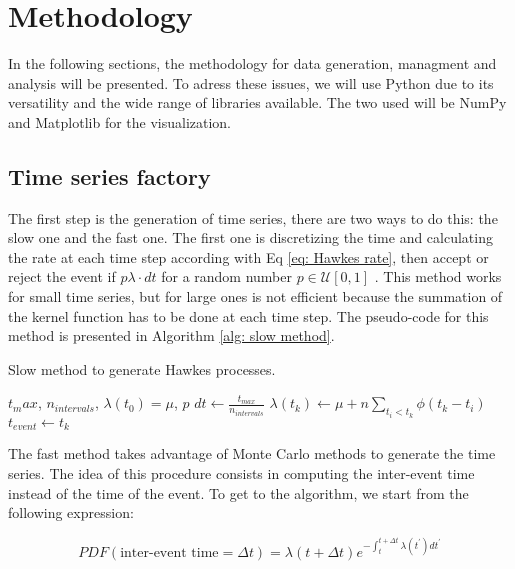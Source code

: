 \chapter{Methodology}\label{ch:metodologia}

In the following sections, the methodology for data generation, managment and analysis will be presented. To adress these issues, we will use Python \cite{McKinney,VanderPlas} due to 
its versatility and the wide range of libraries available. The two used will be NumPy \cite{numpy} and Matplotlib \cite{matplotlib} for the visualization.
 
\section{Time series factory}\label{sec:time_series_factory}

The first step is the generation of time series, there are two ways to do this: the slow one and the fast one. The first one is discretizing the time and calculating the rate at each time step
according with Eq \ref{eq: Hawkes rate}, then accept or reject the event if $p\lambda \cdot dt$ for a random number $p\in \mathcal{U}[0,1]$ . 
This method works for small time series, but for large ones is not efficient because the summation of the kernel function has to be done at each time step. The pseudo-code for this method is
presented in Algorithm \ref{alg: slow method}.

\begin{algorithm}
    \caption{Slow method to generate Hawkes processes.}\label{alg: slow method}
    \begin{algorithmic}
        \Require $t_max$, $n_{intervals}$, $\lambda(t_0)=\mu$, $p$
        \State $dt \gets \frac{t_{max}}{n_{intervals}}$
            \State $\lambda(t_k) \gets \mu + n\sum_{t_i<t_k}\phi(t_k-t_i)$ 
                \State $t_{event} \gets t_k$
            \EndIf
        \EndFor
        \end{algorithmic}
\end{algorithm}

The fast method takes advantage of Monte Carlo methods \cite{barbu2020monte} to generate the time series. The idea of this procedure consists in computing the inter-event time instead 
of the time of the event. To get to the algorithm, we start from the following expression:

\begin{equation}
    PDF(\text{inter-event time}=\Delta t) = \lambda(t+\Delta t) e^{-\int_t^{t+\Delta t}\lambda(t^\prime)dt^\prime} 
    \label{eq: inter-event time PDF}
\end{equation}

